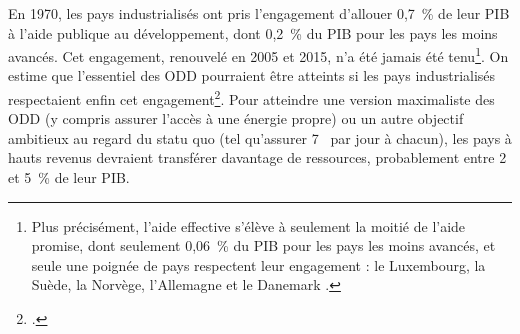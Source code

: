 \documentclass[a5paper,french,openany]{memoir}
\begin{document}
En 1970, les pays industrialisés ont pris l'engagement d'allouer 0,7~\% de leur PIB à l'aide publique au développement, dont 0,2~\% du PIB pour les pays les moins avancés. Cet engagement, renouvelé en 2005 et 2015, n'a été jamais été tenu\footnote{Plus précisément, l'aide effective s'élève à seulement la moitié de l'aide promise, dont seulement 0,06~\% du PIB pour les pays les moins avancés, et seule une poignée de pays respectent leur engagement : le Luxembourg, la Suède, la Norvège, l'Allemagne et le Danemark 
\citep{oecd_oda_2023}.}. 
On estime que l'essentiel des ODD pourraient être atteints si les pays industrialisés respectaient enfin cet engagement\footnote{\citet{sdsn_sdg_2019}.}. Pour atteindre une version maximaliste des ODD (y compris assurer l'accès à une énergie propre) ou un autre objectif ambitieux au regard du statu quo (tel qu'assurer 7~\textit{\texteuro{}} par jour à chacun), les pays à hauts revenus devraient transférer davantage de ressources, probablement entre 2 et 5~\% de leur PIB.%
\end{document}
